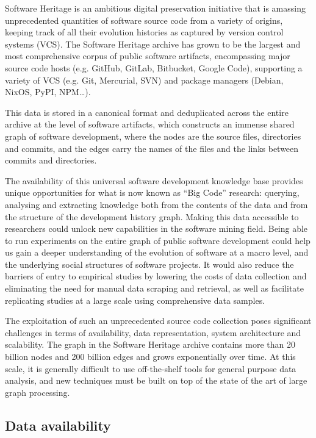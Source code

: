 Software Heritage is an ambitious digital preservation initiative that is
amassing unprecedented quantities of software source code from a variety of
origins, keeping track of all their evolution histories as captured by version
control systems (VCS). The Software Heritage archive has grown to be the
largest and most comprehensive corpus of public software artifacts,
encompassing major source code hosts (e.g. GitHub, GitLab, Bitbucket,
Google Code), supporting a variety of VCS (e.g. Git, Mercurial, SVN) and
package managers (Debian, NixOS, PyPI, NPM…).

This data is stored in a canonical format and deduplicated across the entire
archive at the level of software artifacts, which constructs an immense shared
graph of software development, where the nodes are the source files,
directories and commits, and the edges carry the names of the files and the
links between commits and directories.

The availability of this universal software development knowledge base provides
unique opportunities for what is now known as “Big Code” research: querying,
analysing and extracting knowledge both from the contents of the data and from
the structure of the development history graph. Making this data accessible to
researchers could unlock new capabilities in the software mining field. Being
able to run experiments on the entire graph of public software development
could help us gain a deeper understanding of the evolution of software at a
macro level, and the underlying social structures of software projects. It
would also reduce the barriers of entry to empirical studies by lowering the
costs of data collection and eliminating the need for manual data scraping and
retrieval, as well as facilitate replicating studies at a large scale using
comprehensive data samples.

The exploitation of such an unprecedented source code collection poses
significant challenges in terms of availability, data representation, system
architecture and scalability. The graph in the Software Heritage archive
contains more than 20 billion nodes and 200 billion edges and grows
exponentially over time. At this scale, it is generally difficult to use
off-the-shelf tools for general purpose data analysis, and new techniques must
be built on top of the state of the art of large graph processing.

\subsection*{Data availability}

